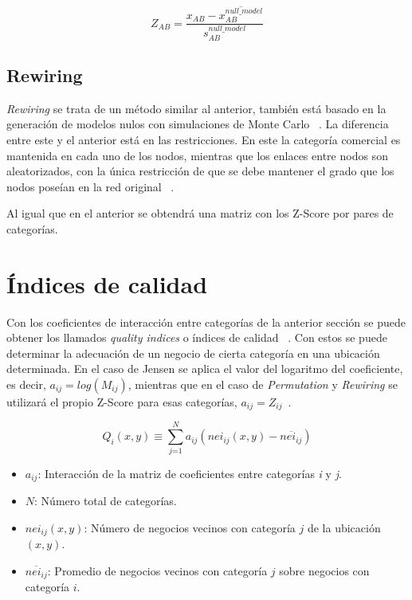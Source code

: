 \begin{equation*}
	Z_{AB} = \frac{x_{AB} - \overline{x_{AB}^{null\_model}}}{s_{AB}^{null\_model}}
\end{equation*}



\subsection{Rewiring}

\textit{Rewiring} se trata de un método similar al anterior, también está basado en la generación de modelos nulos con simulaciones de Monte Carlo ~\cite{Montecarlo}. La diferencia entre este y el anterior está en las restricciones. En este la categoría comercial es mantenida en cada uno de los nodos, mientras que los enlaces entre nodos son aleatorizados, con la única restricción de que se debe mantener el grado que los nodos poseían en la red original ~\cite{Ahedo2021,RSVAJSSHJG}.

Al igual que en el anterior se obtendrá una matriz con los Z-Score por pares de categorías.



\section{Índices de calidad}

Con los coeficientes de interacción entre categorías de la anterior sección se puede obtener los llamados \textit{quality indices} o índices de calidad ~\cite{Ahedo2021,Jensen2006,RSVAJSSHJG}. Con estos se puede determinar la adecuación de un negocio de cierta categoría en una ubicación determinada. En el caso de Jensen se aplica el valor del logaritmo del coeficiente, es decir, $a_{ij} = log(M_{ij})$, mientras que en el caso de \textit{Permutation} y \textit{Rewiring} se utilizará el propio Z-Score para esas categorías, $a_{ij} = Z_{ij}$~\cite{Ahedo2021}. 

\begin{equation*}
	Q_i(x,y) \equiv \sum_\textit{j=1}^N a_{ij} (nei_{ij}(x,y) - \overline{nei_{ij}})
\end{equation*}



\begin{itemize}
	\item $a_{ij}$: Interacción de la matriz de coeficientes entre categorías \textit{i} y \textit{j}.
	\item $N$: Número total de categorías.
	\item $nei_{ij}(x,y)$: Número de negocios vecinos con categoría $j$ de la ubicación $(x,y)$.
	\item $\overline{nei_{ij}}$: Promedio de negocios vecinos con categoría $j$ sobre negocios con categoría $i$.
\end{itemize}

